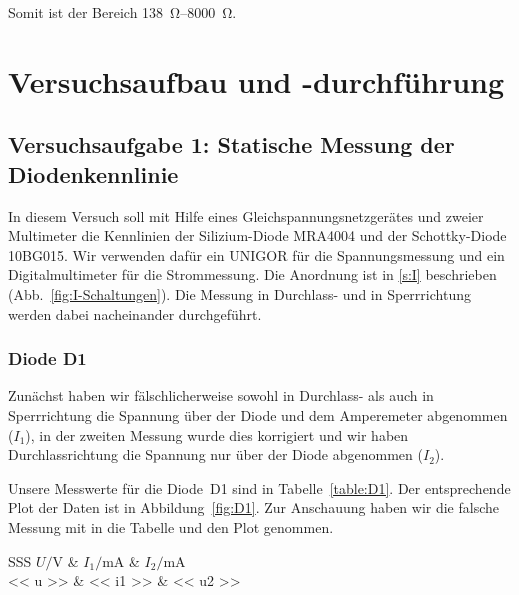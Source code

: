 Somit ist der Bereich \SIrange{138}{8000}{\ohm}.


\FloatBarrier
\section{Versuchsaufbau und -durchführung}

\FloatBarrier
\subsection{Versuchsaufgabe 1: Statische Messung der Diodenkennlinie}

In diesem Versuch soll mit Hilfe eines Gleichspannungsnetzgerätes und zweier
Multimeter die Kennlinien der Silizium-Diode MRA4004 und der Schottky-Diode
10BG015. Wir verwenden dafür ein UNIGOR für die Spannungsmessung und ein
Digitalmultimeter für die Strommessung. Die Anordnung ist in \ref{s:I}
beschrieben (Abb.~\ref{fig:I-Schaltungen}). Die Messung in Durchlass- und in
Sperrrichtung werden dabei nacheinander durchgeführt.

\FloatBarrier
\subsubsection{Diode D1}

Zunächst haben wir fälschlicherweise sowohl in Durchlass- als auch in Sperrrichtung die Spannung über der Diode und dem Amperemeter abgenommen ($I_1$), in der zweiten Messung wurde dies korrigiert und wir haben Durchlassrichtung die Spannung nur über der Diode abgenommen ($I_2$).

Unsere Messwerte für die Diode~D1 sind in Tabelle~\ref{table:D1}. Der
entsprechende Plot der Daten ist in Abbildung~\ref{fig:D1}. Zur Anschauung haben wir die falsche Messung mit in die Tabelle und den Plot genommen.

\begin{table}[htbp]
	\centering
	\begin{tabular}{SSS}
		{$U / \si\volt$} & {$I_1 / \si{\milli\ampere}$} & {$I_2 / \si{\milli\ampere}$} \\
		\hline
		<< u >> & << i1 >> & << u2 >> \\
	\end{tabular}
	\caption{%
		Messdaten zur Diode D1
	}
	\label{table:D1}
\end{table}

